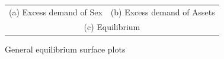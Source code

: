\begin{figure}[H]
\caption{General equilibrium surface plots}
\hspace{-2.0cm}
\begin{center}
\begin{tabular}{cc}
\multicolumn{1}{c}{(a) Excess demand of Sex} &  
\multicolumn{1}{c}{(b) Excess demand of Assets} \\
\multicolumn{2}{c}{(c) Equilibrium} \\  
\end{tabular}
\end{center}
\label{fig:1}
\end{figure}